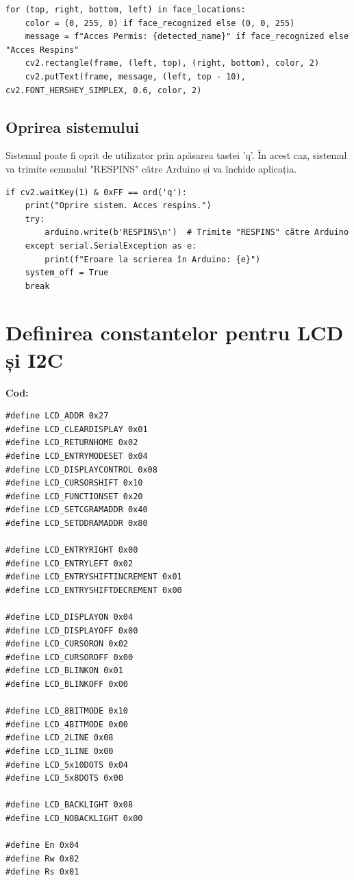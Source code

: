 \documentclass[a4paper,12pt]{report}
\begin{document}
\begin{lstlisting}[caption={Desenarea rezultatelor pe imagine}]
for (top, right, bottom, left) in face_locations:
    color = (0, 255, 0) if face_recognized else (0, 0, 255)
    message = f"Acces Permis: {detected_name}" if face_recognized else "Acces Respins"
    cv2.rectangle(frame, (left, top), (right, bottom), color, 2)
    cv2.putText(frame, message, (left, top - 10), cv2.FONT_HERSHEY_SIMPLEX, 0.6, color, 2)
\end{lstlisting}

\subsection{Oprirea sistemului}
Sistemul poate fi oprit de utilizator prin apăsarea tastei 'q'. În acest caz, sistemul va trimite semnalul "RESPINS" către Arduino și va închide aplicația.

\begin{lstlisting}[caption={Oprirea sistemului}]
if cv2.waitKey(1) & 0xFF == ord('q'):
    print("Oprire sistem. Acces respins.")
    try:
        arduino.write(b'RESPINS\n')  # Trimite "RESPINS" către Arduino
    except serial.SerialException as e:
        print(f"Eroare la scrierea în Arduino: {e}")
    system_off = True
    break
\end{lstlisting}


\section{Definirea constantelor pentru LCD și I2C}
\textbf{Cod:}
\begin{lstlisting}
#define LCD_ADDR 0x27
#define LCD_CLEARDISPLAY 0x01
#define LCD_RETURNHOME 0x02
#define LCD_ENTRYMODESET 0x04
#define LCD_DISPLAYCONTROL 0x08
#define LCD_CURSORSHIFT 0x10
#define LCD_FUNCTIONSET 0x20
#define LCD_SETCGRAMADDR 0x40
#define LCD_SETDDRAMADDR 0x80

#define LCD_ENTRYRIGHT 0x00
#define LCD_ENTRYLEFT 0x02
#define LCD_ENTRYSHIFTINCREMENT 0x01
#define LCD_ENTRYSHIFTDECREMENT 0x00

#define LCD_DISPLAYON 0x04
#define LCD_DISPLAYOFF 0x00
#define LCD_CURSORON 0x02
#define LCD_CURSOROFF 0x00
#define LCD_BLINKON 0x01
#define LCD_BLINKOFF 0x00

#define LCD_8BITMODE 0x10
#define LCD_4BITMODE 0x00
#define LCD_2LINE 0x08
#define LCD_1LINE 0x00
#define LCD_5x10DOTS 0x04
#define LCD_5x8DOTS 0x00

#define LCD_BACKLIGHT 0x08
#define LCD_NOBACKLIGHT 0x00

#define En 0x04
#define Rw 0x02
#define Rs 0x01
\end{lstlisting}
\end{document}
